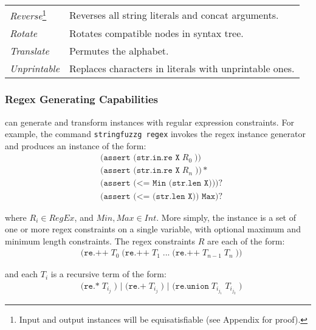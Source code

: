 \begin{table}[t]
\begin{subtable}{1\textwidth}
\begin{tabular}{l l}
            \textit{Reverse}\footnote{Input and output 
            instances will be equisatisfiable (see Appendix for proof).}
            & Reverses all string literals and concat arguments.\\
            \textit{Rotate}
            & Rotates compatible nodes in syntax tree.\\
            \textit{Translate}\footnotemark[4]
            & Permutes the alphabet.\\
            \textit{Unprintable}
            & Replaces characters in literals with unprintable ones.\\
            \bottomrule
        \end{tabular}
    \end{subtable}
\end{table}

\subsubsection{Regex Generating Capabilities}
\fuzzer{} can generate
and transform instances with regular expression constraints. For example, the
command \texttt{stringfuzzg regex} invokes the regex instance
generator and produces an instance of the form:
\begin{align*}
    & \texttt{(assert (str.in.re X}\; R_0\; \texttt{))} \\
    & \texttt{(assert (str.in.re X}\; R_n\; \texttt{))}* \\
    & \texttt{(assert (<= Min (str.len X)))}? \\
    & \texttt{(assert (<= (str.len X)) Max)}?
\end{align*}

where $R_i \in RegEx$, and $Min, Max \in Int$. More simply, the
instance is a set of one or more regex constraints on a single
variable, with optional maximum and minimum length constraints. The
regex constraints $R$ are each of the form:
\begin{align*}
    & \texttt{(re.++}\; T_0\; \texttt{(re.++}\; T_1\;
    \texttt{...}\; \texttt{(re.++}\; T_{n-1}\; T_n\; \texttt{))}
\end{align*}

and each $T_i$ is a recursive term of the form:
\begin{align*}
    & \texttt{(re.*}\; T_{i_j}\; \texttt{) | (re.+}\; T_{i_j}\;
    \texttt{) | (re.union}\; T_{i_{j_1}}\; T_{i_{j_2}}\; \texttt{)}
\end{align*}

